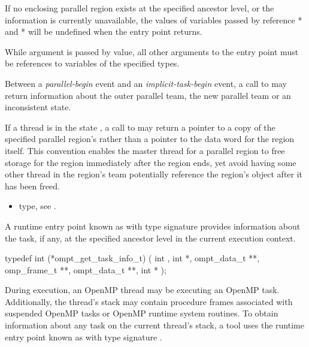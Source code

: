 If no enclosing parallel region exists at the specified ancestor
level, or the information is currently unavailable,
the values of variables passed by reference
* and * will be undefined when the
entry point returns.

\constraints
While argument  is passed by
value, all other arguments to the entry point must be references
to variables of the specified types.


\restrictions
Between a \emph{parallel-begin} event and an \emph{implicit-task-begin}
event, a call to  may return
information about the outer parallel team, the new parallel team or an
inconsistent state.

If a thread is in the state ,
a call to 
may return a pointer to a copy of the specified parallel region's 
rather than a pointer to the data word for the region itself. This convention enables the master thread
for a parallel region to free storage for the region immediately after the region ends, yet
avoid having some other thread in the region's team
potentially reference the region's  object after it has been freed.

\crossreferences
\begin{itemize}
\item {} type, see .
\end{itemize}

\label{sec:ompt_get_task_info_t}
\label{sec:ompt_get_task_info}

\summary
A runtime entry point known as 
with type signature  provides information about the
task, if any, at the specified ancestor level in the current execution
context.

\format
\begin{ccppspecific}
\begin{omptInquiry}
typedef int (*ompt_get_task_info_t) (
  int ,
  int *,
  ompt_data_t **,
  omp_frame_t **,
  ompt_data_t **,
  int *
);
\end{omptInquiry}
\end{ccppspecific}

\descr
During execution, an OpenMP thread may be executing an OpenMP task.
Additionally, the thread's stack may contain
procedure frames associated with suspended OpenMP tasks or
OpenMP runtime system routines.
To obtain information about any task on the current thread's stack,
a tool uses the runtime entry point known as
with type signature .

